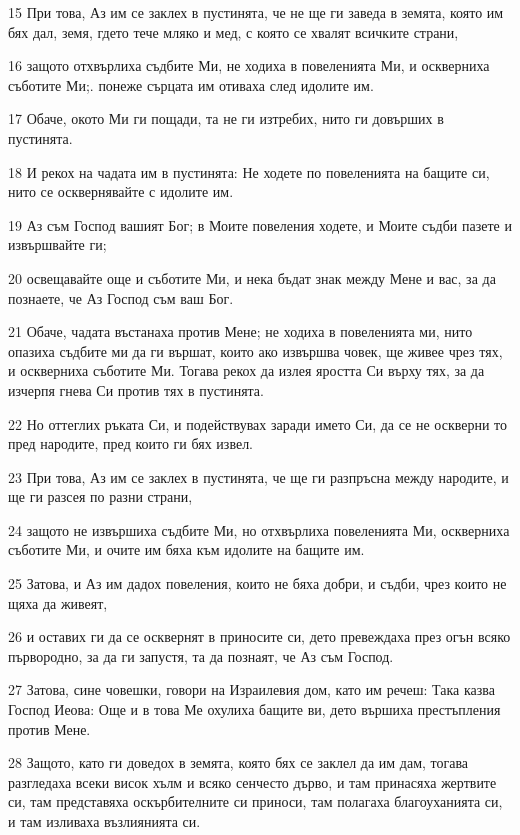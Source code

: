 \par 15 При това, Аз им се заклех в пустинята, че не ще ги заведа в земята, която им бях дал, земя, гдето тече мляко и мед, с която се хвалят всичките страни,
\par 16 защото отхвърлиха съдбите Ми, не ходиха в повеленията Ми, и оскверниха съботите Ми;. понеже сърцата им отиваха след идолите им.
\par 17 Обаче, окото Ми ги пощади, та не ги изтребих, нито ги довърших в пустинята.
\par 18 И рекох на чадата им в пустинята: Не ходете по повеленията на бащите си, нито се осквернявайте с идолите им.
\par 19 Аз съм Господ вашият Бог; в Моите повеления ходете, и Моите съдби пазете и извършвайте ги;
\par 20 освещавайте още и съботите Ми, и нека бъдат знак между Мене и вас, за да познаете, че Аз Господ съм ваш Бог.
\par 21 Обаче, чадата въстанаха против Мене; не ходиха в повеленията ми, нито опазиха съдбите ми да ги вършат, които ако извършва човек, ще живее чрез тях, и оскверниха съботите Ми. Тогава рекох да излея яростта Си върху тях, за да изчерпя гнева Си против тях в пустинята.
\par 22 Но оттеглих ръката Си, и подействувах заради името Си, да се не оскверни то пред народите, пред които ги бях извел.
\par 23 При това, Аз им се заклех в пустинята, че ще ги разпръсна между народите, и ще ги разсея по разни страни,
\par 24 защото не извършиха съдбите Ми, но отхвърлиха повеленията Ми, оскверниха съботите Ми, и очите им бяха към идолите на бащите им.
\par 25 Затова, и Аз им дадох повеления, които не бяха добри, и съдби, чрез които не щяха да живеят,
\par 26 и оставих ги да се осквернят в приносите си, дето превеждаха през огън всяко първородно, за да ги запустя, та да познаят, че Аз съм Господ.
\par 27 Затова, сине човешки, говори на Израилевия дом, като им речеш: Така казва Господ Иеова: Още и в това Ме охулиха бащите ви, дето вършиха престъпления против Мене.
\par 28 Защото, като ги доведох в земята, която бях се заклел да им дам, тогава разгледаха всеки висок хълм и всяко сенчесто дърво, и там принасяха жертвите си, там представяха оскърбителните си приноси, там полагаха благоуханията си, и там изливаха възлиянията си.
